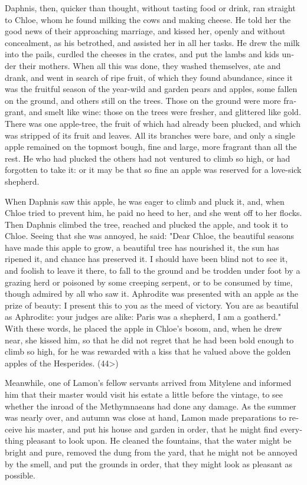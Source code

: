 \documentclass{book}
\begin{document}
\begin{pairs}
\begin{Rightside}
\begin{english}
  Daphnis, then, quicker than thought, without tasting food or drink, ran straight to Chloe, whom he found milking the cows and making cheese.  He told her the good news of their approaching marriage, and kissed her, openly and without concealment, as his betrothed, and assisted her in all her tasks.  He drew the milk into the pails, curdled the cheeses in the crates, and put the lambs and kids under their mothers.  When all this was done, they washed themselves, ate and drank, and went in search of ripe fruit, of which they found abundance, since it was the fruitful season of the year-wild and garden pears and apples, some fallen on the ground, and others still on the trees.  Those on the ground were more fragrant, and smelt like wine: those on the trees were fresher, and glittered like gold.  There was one apple-tree, the fruit of which had already been plucked, and which was stripped of its fruit and leaves.  All its branches were bare, and only a single apple remained on the topmost bough, fine and large, more fragrant than all the rest.  He who had plucked the others had not ventured to climb so high, or had forgotten to take it: or it may be that so fine an apple was reserved for a love-sick shepherd.
\pend


  When Daphnis saw this apple, he was eager to climb and pluck it, and, when Chloe tried to prevent him, he paid no heed to her, and she went off to her flocks.  Then Daphnis climbed the tree, reached and plucked the apple, and took it to Chloe.  Seeing that she was annoyed, he said: "Dear Chloe, the beautiful seasons have made this apple to grow, a beautiful tree has nourished it, the sun has ripened it, and chance has preserved it.  I should have been blind not to see it, and foolish to leave it there, to fall to the ground and be trodden under foot by a grazing herd or poisoned by some creeping serpent, or to be consumed by time, though admired by all who saw it.  Aphrodite was presented with an apple as the prize of beauty: I present this to you as the meed of victory.  You are as beautiful as Aphrodite: your judges are alike: Paris was a shepherd, I am a goatherd."  With these words, he placed the apple in Chloe's bosom, and, when he drew near, she kissed him, so that he did not regret that he had been bold enough to climb so high, for he was rewarded with a kiss that he valued above the golden apples of the Hesperides.  (44>)
\pend


  Meanwhile, one of Lamon's fellow servants arrived from Mitylene and informed him that their master would visit his estate a little before the vintage, to see whether the inroad of the Methymnaeans had done any damage.  As the summer was nearly over, and autumn was close at hand, Lamon made preparations to receive his master, and put his house and garden in order, that he might find everything pleasant to look upon. He cleaned the fountains, that the water might be bright and pure, removed the dung from the yard, that he might not be annoyed by the smell, and put the grounds in order, that they might look as pleasant as possible.
\pend



\end{english}
\end{Rightside}
\end{pairs}
\end{document}
